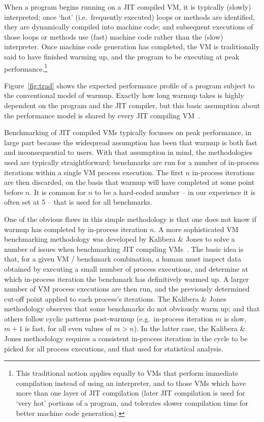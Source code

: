 \documentclass[a4paper,UKenglish]{lipics}
\newcommand{\kalibera}{Kalibera \& Jones\xspace}
\begin{document}
When a program begins running on a JIT compiled VM, it is typically (slowly)
interpreted; once `hot' (i.e.~frequently executed) loops or methods are
identified, they are dynamically compiled into machine code; and subsequent
executions of those loops or methods use (fast) machine code rather than the
(slow) interpreter. Once machine code generation has completed, the VM is
traditionally said to have finished warming up, and the program to be executing
at peak performance.\footnote{This traditional notion applies equally to VMs
that perform immediate compilation instead of using an interpreter, and to
those VMs which have more than one layer of JIT compilation (later JIT
compilation is used for `very hot' portions of a program, and tolerates slower
compilation time for better machine code generation).}

Figure~\ref{fig:trad} shows the expected performance profile of a
program subject to the conventional model of warmup. Exactly how long warmup
takes is highly dependent on
the program and the JIT compiler, but this basic assumption about the
performance model is shared by every JIT compiling
VM~\cite{kalibera13rigorous}.

Benchmarking of JIT compiled VMs typically focusses on peak
performance, in large part because the widespread assumption has been that
warmup is both fast and inconsequential to users. With that assumption in mind, the
methodologies used are typically straightforward: benchmarks are run for a number
of in-process iterations within a single VM process execution.
The first $n$ in-process iterations are then discarded, on the basis that warmup
will have completed at some point before $n$. It is common for
$n$ to be a hard-coded number -- in our experience it is often set at 5 --
that is used for all benchmarks.

One of the obvious flaws in this simple methodology is that one does not know if warmup
has completed by in-process iteration $n$. A more sophisticated VM benchmarking methodology
was developed by \kalibera to solve a number of issues when benchmarking JIT
compiling VMs~\cite{kalibera12quantifying,kalibera13rigorous}. The basic idea is
that, for a given VM / benchmark combination, a human must inspect data obtained by
executing a small number of process executions, and determine at which in-process iteration the
benchmark has definitively warmed up. A larger number of VM process executions are then
run, and the previously determined cut-off point applied to each process's
iterations. The \kalibera methodology observes that some benchmarks do not
obviously warm up; and that others follow cyclic patterns post-warmup
(e.g.~in-process iteration $m$ is slow, $m+1$ is fast, for all even values of $m > n$). In
the latter case, the \kalibera methodology requires a consistent in-process iteration in
the cycle to be picked for all process executions, and that used for statistical analysis.
\end{document}
